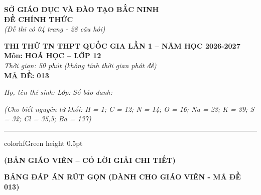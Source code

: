 \documentclass[11pt,a4paper]{article}
\begin{document}
\begin{minipage}[t]{0.48\textwidth}
\textbf{SỞ GIÁO DỤC VÀ ĐÀO TẠO BẮC NINH}\\
\textbf{ĐỀ CHÍNH THỨC}\\
\textit{(Đề thi có 04 trang - 28 câu hỏi)}
\end{minipage}
\hfill
\begin{minipage}[t]{0.48\textwidth}
\raggedleft
\textbf{\color{hfRed}THI THỬ TN THPT QUỐC GIA LẦN 1 -- NĂM HỌC 2026-2027}\\
\textbf{Môn: HOÁ HỌC -- LỚP 12}\\
\textit{Thời gian: 50 phút (không tính thời gian phát đề)}\\
\textbf{MÃ ĐỀ: 013}
\end{minipage}

\vspace{4pt}
\noindent
\textit{Họ, tên thí sinh:} \dotfill \textit{Lớp:} \dotfill \textit{Số báo danh:} \dotfill

\vspace{3pt}
\noindent
\textit{\footnotesize (Cho biết nguyên tử khối: H = 1; C = 12; N = 14; O = 16; Na = 23; K = 39; S = 32; Cl = 35,5; Ba = 137)}

\vspace{3pt}
\hrule color{hfGreen} height 0.5pt

\vspace{4pt}
\begin{center}
\textbf{\color{hfRed}\large (BẢN GIÁO VIÊN -- CÓ LỜI GIẢI CHI TIẾT)}
\end{center}

\vspace{2pt}
\begin{center}
{\color{hfRed}\textbf{\large BẢNG ĐÁP ÁN RÚT GỌN (DÀNH CHO GIÁO VIÊN - MÃ ĐỀ 013)}}
\end{center}
\end{document}
